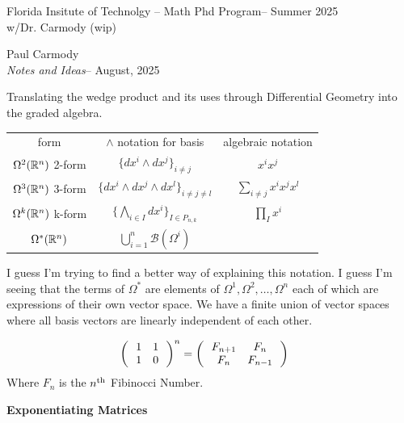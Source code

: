 \documentclass[12pt,a4paper]{report}
\newcommand{\CLASSNAME}{Florida Insitute of Technolgy -- Math Phd Program}
\newcommand{\STUDENTNAME}{Paul Carmody}
\newcommand{\ASSIGNMENT}{\textit{Notes and Ideas}}
\newcommand{\DUEDATE}{August, 2025}
\newcommand{\PROFESSOR}{Dr. Carmody (wip)}
\newcommand{\SEMESTER}{Summer 2025}
\begin{document}
\begin{center}
	\Large{\CLASSNAME -- \SEMESTER} \\
	\large{ w/\PROFESSOR}
\end{center}
\begin{center}
	\STUDENTNAME \\
	\ASSIGNMENT -- \DUEDATE\\
\end{center} 

Translating the wedge product and its uses through Differential Geometry into the graded algebra.  

\begin{tabular}{ccc}
	form & $\wedge$ notation for basis & algebraic notation\\
	$\Omega^2(\mathbb{R}^n)$ 2-form & $\{ dx^i \wedge dx^j \}_{i\ne j}$ & $x^ix^j$\\
	$\Omega^3(\mathbb{R}^n)$ 3-form & $\{ dx^i \wedge dx^j \wedge dx^l\}_{i\ne j \ne l}$ & $\sum_{i \ne j} x^ix^jx^l$\\
	$\Omega^k(\mathbb{R}^n)$ k-form & $\{\bigwedge_{i\in I} dx^i\}_{I \in P_{n,k}}$ & $\prod_I x^i$ \\
	$\Omega^*(\mathbb{R}^n)$ & $\bigcup_{i=1}^n \mathcal{B}(\Omega^i)$ &
\end{tabular}

I guess I'm trying to find a better way of explaining this notation.  I guess I'm seeing that the terms of $\Omega^*$ are elements of $\Omega^1, \Omega^2, \dots, \Omega^n$ each of which are expressions of their own vector space.  We have a finite union of vector spaces where all basis vectors are linearly independent of each other.

\HLINE
\begin{align*}
	\left (\,  \begin{array}{c c} 1&1 \\ 1 & 0 \end{array}  \,\right )^n &= \left (\,  \begin{array}{c c} F_{n+1}&F_n \\ F_n & F_{n-1} \end{array}  \,\right )
\end{align*}Where $F_n$ is the $n\textsuperscript{th}$ Fibinocci Number.

\HLINE
\textbf{Exponentiating Matrices}
\end{document}

